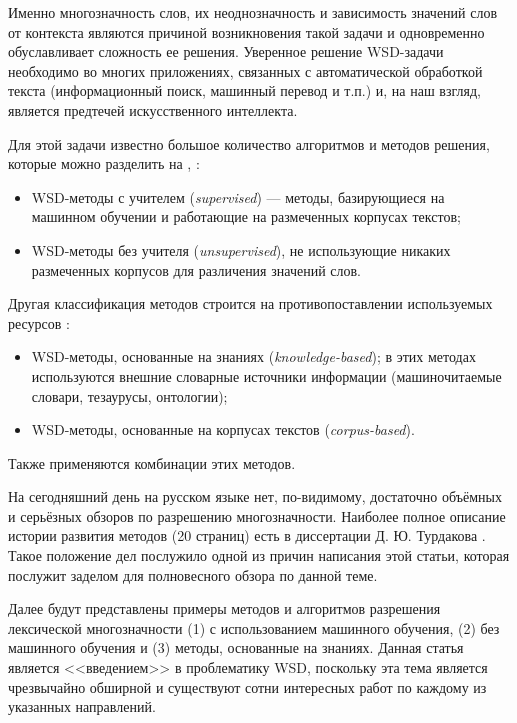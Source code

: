 \documentclass{article}
\begin{document}
\begin{articletext}
Именно многозначность слов, их неоднозначность и зависимость значений слов от контекста являются причиной возникновения такой задачи и одновременно обуславливает сложность ее решения. Уверенное решение WSD-задачи необходимо во многих приложениях, связанных с автоматической обработкой текста (информационный поиск, машинный перевод и т.п.) и, на наш взгляд, является предтечей искусственного интеллекта.

Для этой задачи известно большое количество алгоритмов и методов решения, которые можно разделить на \cite{Lukash 2011}, \cite{Navigli 2009}: 

\begin{itemize}
\item WSD-методы с учителем (\textit{supervised}) --- методы, базирующиеся на машинном обучении и работающие на размеченных корпусах текстов; 
\item WSD-методы без учителя (\textit{unsupervised}), не использующие никаких размеченных корпусов для различения значений слов.
\end{itemize}

Другая классификация методов строится на противопоставлении используемых ресурсов \cite{Navigli 2009}:
\begin{itemize}
\item WSD-методы, основанные на знаниях (\textit{knowledge-based}); в этих методах используются внешние словарные источники информации (машиночитаемые словари, тезаурусы, онтологии);
\item WSD-методы, основанные на корпусах текстов (\textit{corpus-based}).
\end{itemize}

Также применяются комбинации этих методов.

На сегодняшний день на русском языке нет, по-видимому, достаточно объёмных и серьёзных обзоров по разрешению многозначности. Наиболее полное описание истории развития методов (20 страниц) есть в диссертации Д. Ю. Турдакова \cite{Trudakov 2010}. Такое положение дел послужило одной из причин написания этой статьи, которая послужит заделом для полновесного обзора по данной теме.

Далее будут представлены примеры методов и алгоритмов разрешения лексической многозначности (1) с использованием машинного обучения, (2) без машинного обучения и (3) методы, основанные на знаниях. Данная статья является <<введением>> в проблематику WSD, поскольку эта тема является чрезвычайно обширной и существуют сотни интересных работ по каждому из указанных направлений.


\end{articletext}
\end{document}
